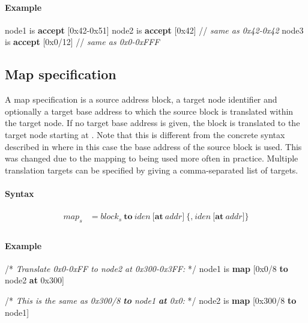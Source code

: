 \documentclass[a4paper,11pt,twoside]{report}
\begin{document}
{{{\paragraph{Example}
\begin{syntax}
    node1 is \textbf{accept} [0x42-0x51]
    node2 is \textbf{accept} [0x42]      // \textit{same as \textup{0x42-0x42}}
    node3 is \textbf{accept} [0x0/12]    // \textit{same as \textup{0x0-0xFFF}}
\end{syntax}

\subsection{Map specification}
A map specification is a source address block, a target node identifier and optionally a target base address to which the source block is translated within the target node.
If no target base address is given, the block is translated to the target node starting at .
Note that this is different from the concrete syntax described in \cite{achermann:mars17} where in this case the base address of the source block is used.
This was changed due to the mapping to  being used more often in practice.
Multiple translation targets can be specified by giving a comma-separated list of targets.

\paragraph{Syntax}
\begin{align*}
\textit{map}_s & \mathop{=}
\textit{block}_s\ \textbf{to}\ \textit{iden}\ 
    \Big[
        \textbf{at}\ \textit{addr}
    \Big]\
    \Big\{
        \textbf{,}\ \textit{iden}\ 
        \Big[
            \textbf{at}\ \textit{addr}
        \Big]
    \Big\}\\
\end{align*}

\paragraph{Example}
\begin{syntax}
    /* \textit{Translate \textup{0x0-0xFF} to \textup{node2} at \textup{0x300-0x3FF}:} */
    node1 is \textbf{map} [0x0/8 \textbf{to} node2 \textbf{at} 0x300] 

    /* \textit{This is the same as \textup{0x300/8 \textbf{to} node1 \textbf{at} 0x0}:} */
    node2 is \textbf{map} [0x300/8 \textbf{to} node1]


\end{syntax}}}}
\end{document}
